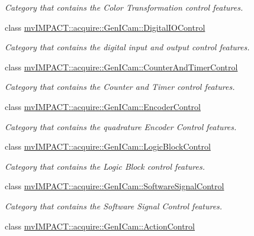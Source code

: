 \begin{DoxyCompactItemize}
\begin{DoxyCompactList}\small\item\em Category that contains the Color Transformation control features. \end{DoxyCompactList}\item 
class \hyperlink{classmv_i_m_p_a_c_t_1_1acquire_1_1_gen_i_cam_1_1_digital_i_o_control}{mv\+I\+M\+P\+A\+C\+T\+::acquire\+::\+Gen\+I\+Cam\+::\+Digital\+I\+O\+Control}
\begin{DoxyCompactList}\small\item\em Category that contains the digital input and output control features. \end{DoxyCompactList}\item 
class \hyperlink{classmv_i_m_p_a_c_t_1_1acquire_1_1_gen_i_cam_1_1_counter_and_timer_control}{mv\+I\+M\+P\+A\+C\+T\+::acquire\+::\+Gen\+I\+Cam\+::\+Counter\+And\+Timer\+Control}
\begin{DoxyCompactList}\small\item\em Category that contains the Counter and Timer control features. \end{DoxyCompactList}\item 
class \hyperlink{classmv_i_m_p_a_c_t_1_1acquire_1_1_gen_i_cam_1_1_encoder_control}{mv\+I\+M\+P\+A\+C\+T\+::acquire\+::\+Gen\+I\+Cam\+::\+Encoder\+Control}
\begin{DoxyCompactList}\small\item\em Category that contains the quadrature Encoder Control features. \end{DoxyCompactList}\item 
class \hyperlink{classmv_i_m_p_a_c_t_1_1acquire_1_1_gen_i_cam_1_1_logic_block_control}{mv\+I\+M\+P\+A\+C\+T\+::acquire\+::\+Gen\+I\+Cam\+::\+Logic\+Block\+Control}
\begin{DoxyCompactList}\small\item\em Category that contains the Logic Block control features. \end{DoxyCompactList}\item 
class \hyperlink{classmv_i_m_p_a_c_t_1_1acquire_1_1_gen_i_cam_1_1_software_signal_control}{mv\+I\+M\+P\+A\+C\+T\+::acquire\+::\+Gen\+I\+Cam\+::\+Software\+Signal\+Control}
\begin{DoxyCompactList}\small\item\em Category that contains the Software Signal Control features. \end{DoxyCompactList}\item 
class \hyperlink{classmv_i_m_p_a_c_t_1_1acquire_1_1_gen_i_cam_1_1_action_control}{mv\+I\+M\+P\+A\+C\+T\+::acquire\+::\+Gen\+I\+Cam\+::\+Action\+Control}

\end{DoxyCompactItemize}
